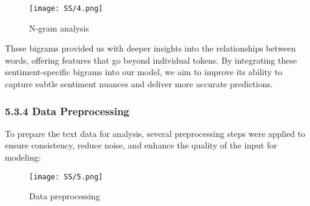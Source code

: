 \documentclass[journal]{IEEEtran}
\begin{document}
\begin{figure}[H]
\centering
\texttt{[image: SS/4.png]}
\caption{N-gram analysis }
\end{figure}

These bigrams provided us with deeper insights into the relationships between words, offering features that go beyond individual tokens. By integrating these sentiment-specific bigrams into our model, we aim to improve its ability to capture subtle sentiment nuances and deliver more accurate predictions.	

\subsubsection*{\textbf{5.3.4 Data Preprocessing}}
To prepare the text data for analysis, several preprocessing steps were applied to ensure consistency, reduce noise, and enhance the quality of the input for modeling:
\begin{figure}[H]
\centering
\texttt{[image: SS/5.png]}
\caption{Data preprocessing}
\end{figure}
\end{document}
